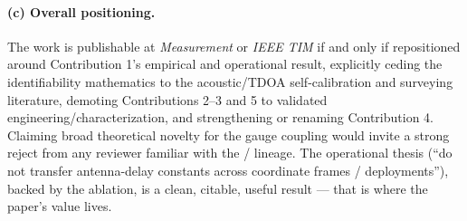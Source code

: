\paragraph{(c) Overall positioning.}
The work is publishable at \emph{Measurement} or \emph{IEEE TIM} if and only if repositioned around Contribution 1's empirical and operational result, explicitly ceding the identifiability mathematics to the acoustic/TDOA self-calibration and surveying literature, demoting Contributions 2--3 and 5 to validated engineering/characterization, and strengthening or renaming Contribution 4. Claiming broad theoretical novelty for the gauge coupling would invite a strong reject from any reviewer familiar with the \cite{kuang2013stratified} / \cite{batstone2019robust} lineage. The operational thesis (``do not transfer antenna-delay constants across coordinate frames / deployments''), backed by the ablation, is a clean, citable, useful result --- that is where the paper's value lives.

